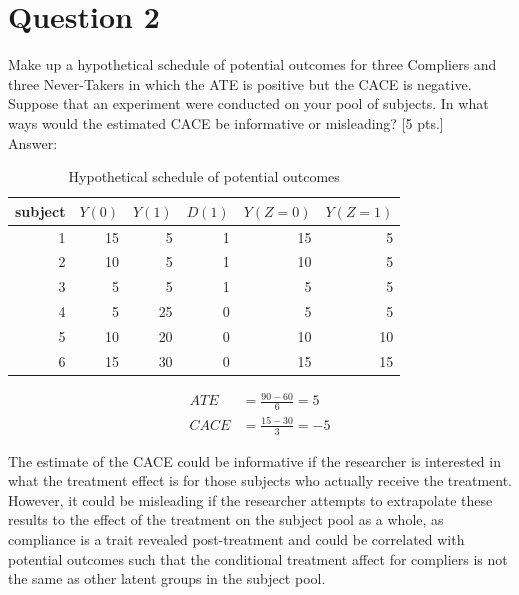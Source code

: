 \documentclass[11pt,notitlepage]{article}\usepackage[]{graphicx}\usepackage[]{color}
\begin{document}
\section*{Question 2}
Make up a hypothetical schedule of potential outcomes for three Compliers and three Never-Takers in which the ATE is positive but the CACE is negative. Suppose that an experiment were conducted on your pool of subjects. In what ways would the estimated CACE be informative or misleading? [5 pts.]\\
Answer:\\

\begin{table}[htbp]
  \centering
  \caption{Hypothetical schedule of potential outcomes}
    \begin{tabular}{rrrrrr}
    \toprule
    subject & $Y(0)$  & $Y(1)$  & $D(1)$  & $Y(Z=0)$ & $ Y(Z=1) $\\
    \midrule
    1     & 15    & 5     & 1     & 15    & 5 \\
    2     & 10    & 5     & 1     & 10    & 5 \\
    3     & 5     & 5     & 1     & 5     & 5 \\
    4     & 5     & 25    & 0     & 5     & 5 \\
    5     & 10    & 20    & 0     & 10    & 10 \\
    6     & 15    & 30    & 0     & 15    & 15 \\
    \bottomrule
    \end{tabular}%
  \label{tab:addlabel}%
\end{table}%

\begin{align*}
ATE &= \frac{90 - 60}{6} = 5\\
CACE  &= \frac{15 - 30}{3} = -5
\end{align*}

The estimate of the CACE could be informative if the researcher is interested in what the treatment effect is for those subjects who actually receive the treatment. However, it could be misleading if the researcher attempts to extrapolate these results to the effect of the treatment on the subject pool as a whole, as compliance is a trait revealed post-treatment and could be correlated with potential outcomes such that the conditional treatment affect for compliers is not the same as other latent groups in the subject pool.
\end{document}
